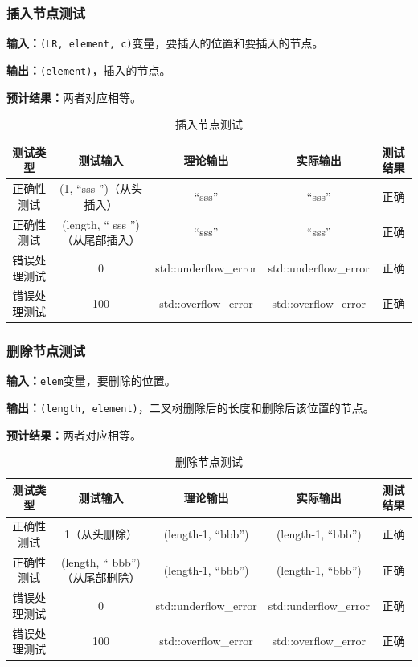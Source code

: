 \subsubsection{插入节点测试}
\textbf{输入：}\texttt{(LR, element, c)}变量，要插入的位置和要插入的节点。
\par
\textbf{输出：}\texttt{(element)}，插入的节点。
\par
\textbf{预计结果：}两者对应相等。
\begin{table}[Htb]
    \centering
    \caption{插入节点测试}
    \begin{tabular}{@{}ccccc@{}}
        \toprule
        \multicolumn{1}{c}{测试类型}    & \multicolumn{1}{c}{测试输入} & \multicolumn{1}{c}{理论输出} & \multicolumn{1}{c}{实际输出} &
        \multicolumn{1}{c}{测试结果} \\ \midrule
        \multicolumn{1}{c|}{正确性测试}  & (1, ``sss '')（从头插入）&``sss''& ``sss''&正确\\
        \multicolumn{1}{c|}{正确性测试}  & (length, `` sss '')（从尾部插入）&``sss''& ``sss''&正确\\
        \multicolumn{1}{c|}{错误处理测试} & 0& std::underflow\_error& std::underflow\_error& 正确\\
        \multicolumn{1}{c|}{错误处理测试} & 100& std::overflow\_error& std::overflow\_error& 正确\\ \bottomrule
    \end{tabular}
    \label{tab:inserttest3}
\end{table}


\subsubsection{删除节点测试}
\textbf{输入：}\texttt{elem}变量，要删除的位置。
\par
\textbf{输出：}\texttt{(length, element)}，二叉树删除后的长度和删除后该位置的节点。
\par
\textbf{预计结果：}两者对应相等。
\begin{table}[Htb]
    \centering
    \caption{删除节点测试}
    \begin{tabular}{@{}ccccc@{}}
        \toprule
        \multicolumn{1}{c}{测试类型}    & \multicolumn{1}{c}{测试输入} & \multicolumn{1}{c}{理论输出} & \multicolumn{1}{c}{实际输出} &
        \multicolumn{1}{c}{测试结果} \\ \midrule
        \multicolumn{1}{c|}{正确性测试}  & 1（从头删除）&(length-1, ``bbb'')&(length-1, ``bbb'')&正确\\
        \multicolumn{1}{c|}{正确性测试}  & (length, `` bbb'')（从尾部删除）&(length-1, ``bbb'')&(length-1, ``bbb'')&正确\\
        \multicolumn{1}{c|}{错误处理测试} & 0& std::underflow\_error& std::underflow\_error& 正确\\
        \multicolumn{1}{c|}{错误处理测试} & 100& std::overflow\_error& std::overflow\_error& 正确\\ \bottomrule
    \end{tabular}
    \label{tab:deletetest3}
\end{table}


